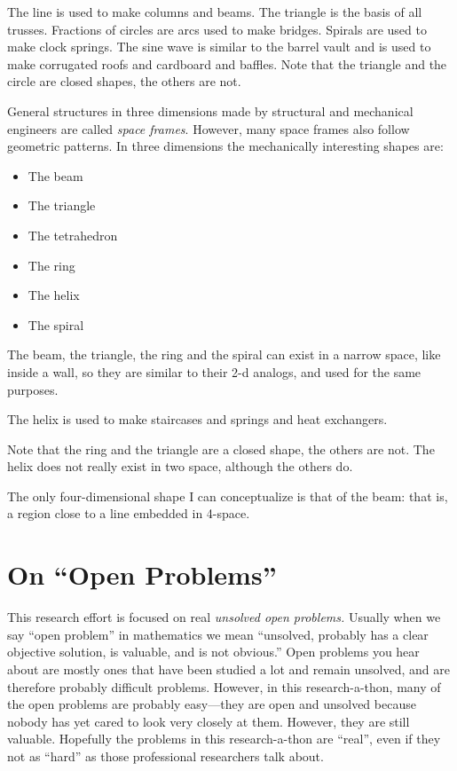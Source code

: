 \documentclass[11pt]{article}
\begin{document}
The line is used to make columns and beams. The triangle is the basis of all trusses.
Fractions of circles are arcs used to make bridges. Spirals are used to make clock springs.
The sine wave is similar to the barrel vault and is used to make corrugated roofs and cardboard
and baffles.
Note that the triangle and the circle are closed shapes, the others are not.

General structures in three dimensions made by structural and mechanical engineers are
called {\em space frames}. However, many space frames also follow geometric patterns.
In three dimensions the mechanically interesting shapes are:
\begin{itemize}
\item The beam
\item The triangle
\item The tetrahedron
\item The ring
\item The helix
\item The spiral
\end{itemize}

The beam, the triangle, the ring and the spiral can exist in a narrow space, like inside a wall,
so they are similar to their 2-d analogs, and used for the same purposes.

The helix is used to make staircases and springs and heat exchangers.

Note that the ring and the triangle are a closed shape, the others are not.
The helix does not really exist in two space, although the others do.

The only four-dimensional shape I can conceptualize is that of the
beam: that is, a region close to a line embedded in 4-space.

\section{On ``Open Problems''}

This research effort is focused on real {\em unsolved open problems.}
Usually when we say ``open problem'' in mathematics we mean ``unsolved, probably has a clear objective solution, is valuable,
and is not obvious.''
Open problems you hear about are mostly ones that have been studied a lot and remain unsolved, and are therefore probably difficult problems.
However, in this research-a-thon, many of the open problems are probably easy---they are open and unsolved because nobody has yet
cared to look very closely at them.  However, they are still valuable. Hopefully the problems in this research-a-thon are ``real'', even if they
not as ``hard'' as those professional researchers talk about. 
\end{document}
